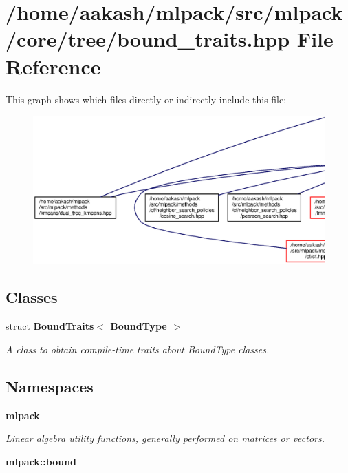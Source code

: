 \section{/home/aakash/mlpack/src/mlpack/core/tree/bound\+\_\+traits.hpp File Reference}
\label{bound__traits_8hpp}
This graph shows which files directly or indirectly include this file\+:
\nopagebreak
\begin{figure}[H]
\begin{center}
\leavevmode
\includegraphics[width=350pt]{bound__traits_8hpp__dep__incl}
\end{center}
\end{figure}
\subsection*{Classes}
\begin{DoxyCompactItemize}
\item 
struct \textbf{ Bound\+Traits$<$ Bound\+Type $>$}
\begin{DoxyCompactList}\small\item\em A class to obtain compile-\/time traits about Bound\+Type classes. \end{DoxyCompactList}\end{DoxyCompactItemize}
\subsection*{Namespaces}
\begin{DoxyCompactItemize}
\item 
 \textbf{ mlpack}
\begin{DoxyCompactList}\small\item\em Linear algebra utility functions, generally performed on matrices or vectors. \end{DoxyCompactList}\item 
 \textbf{ mlpack\+::bound}
\end{DoxyCompactItemize}


